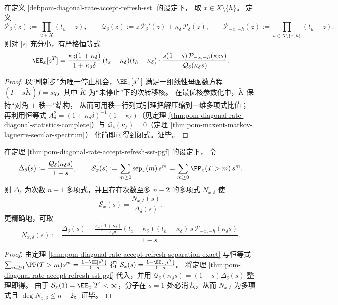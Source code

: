 \begin{theorem}[强平稳时刻的母函数闭式]\label{thm:pom-diagonal-rate-accept-refresh-sst-pgf}
在定义 \ref{def:pom-diagonal-rate-accept-refresh-sst} 的设定下，
取 \(x\in X\setminus\{h\}\)。
定义
\[
\mathcal P_\delta(z):=\prod_{u\in X}(t_u-z),
\qquad
\mathcal Q_\delta(z):=z\,\mathcal P_\delta'(z)+\kappa_\delta\,\mathcal P_\delta(z),
\qquad
\mathcal P_{-x,-h}(z):=\prod_{u\in X\setminus\{x,h\}}(t_u-z).
\]
则对 \(|s|\) 充分小，有严格恒等式
\[
\EE_x[s^T]
=\frac{\kappa_\delta(1+\kappa_\delta)}{1+\kappa_\delta\delta}\,
(t_x-\kappa_\delta)(t_h-\kappa_\delta)\cdot
\frac{s(1-s)\,\mathcal P_{-x,-h}(\kappa_\delta s)}{\mathcal Q_\delta(\kappa_\delta s)}.
\]
\end{theorem}
\begin{proof}
以“刷新步”为唯一停止机会，\(\EE_x[s^T]\) 满足一组线性母函数方程 \((I-s\widetilde K)f=sq\)，其中 \(\widetilde K\) 为“未停止”下的次转移核。
在最优核参数化中，\(\widetilde K\) 保持“对角 \(+\) 秩一”结构，
从而可用秩一行列式引理把解压缩到一维多项式比值；
再利用恒等式 \(A_\delta^2=(1+\kappa_\delta\delta)^{-1}(1+\kappa_\delta)\)（见定理 \ref{thm:pom-diagonal-rate-diagonal-statistics-complete}）与
\(\mathcal Q_\delta(\kappa_\delta)=0\)（定理 \ref{thm:pom-maxent-markov-laguerre-secular-spectrum}）
化简即可得到闭式。证毕。
\end{proof}

\begin{corollary}[分离距离母函数的有理性]\label{cor:pom-diagonal-rate-separation-pgf-rational}
在定理 \ref{thm:pom-diagonal-rate-accept-refresh-sst-pgf} 的设定下，
令
\[
\Delta_\delta(s):=\frac{\mathcal Q_\delta(\kappa_\delta s)}{1-s},
\qquad
\mathcal S_x(s):=\sum_{m\ge 0}\mathrm{sep}_x(m)\,s^m=\sum_{m\ge 0}\PP_x(T>m)\,s^m.
\]
则 \(\Delta_\delta\) 为次数 \(n-1\) 多项式，并且存在次数至多 \(n-2\) 的多项式 \(N_{x,\delta}\) 使
\[
\mathcal S_x(s)=\frac{N_{x,\delta}(s)}{\Delta_\delta(s)}.
\]
更精确地，可取
\[
N_{x,\delta}(s)
:=\frac{\Delta_\delta(s)
-\frac{\kappa_\delta(1+\kappa_\delta)}{1+\kappa_\delta\delta}(t_x-\kappa_\delta)(t_h-\kappa_\delta)\,
s\,\mathcal P_{-x,-h}(\kappa_\delta s)}{1-s}.
\]
\end{corollary}
\begin{proof}
由定理 \ref{thm:pom-diagonal-rate-accept-refresh-separation-exact} 与恒等式
\(
\sum_{m\ge 0}\PP(T>m)s^m=\frac{1-\EE[s^T]}{1-s}
\)
得
\(
\mathcal S_x(s)=\frac{1-\EE_x[s^T]}{1-s}
\)。
将定理 \ref{thm:pom-diagonal-rate-accept-refresh-sst-pgf} 代入，并用
\(\mathcal Q_\delta(\kappa_\delta s)=(1-s)\Delta_\delta(s)\)
整理即得。
由于 \(\mathcal S_x(1)=\EE_x[T]<\infty\)，分子在 \(s=1\) 处必消去，从而 \(N_{x,\delta}\) 为多项式且 \(\deg N_{x,\delta}\le n-2\)。证毕。
\end{proof}

